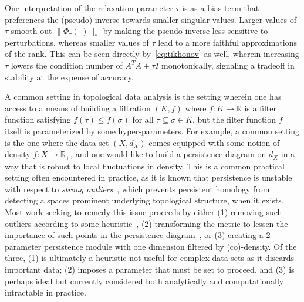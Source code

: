 \documentclass[10pt]{article}
\numberwithin{equation}{section}
\newcommand{\+}{%
	\raisebox{0.18ex}{\scaleobj{0.55}{+}}
}
\theoremstyle{definition}
\theoremstyle{definition}
\begin{document}
 One interpretation of the relaxation parameter $\tau$ is as a bias term that preferences the (pseudo)-inverse towards smaller singular values.
Larger values of $\tau$ smooth out $\lVert \Phi_\tau(\cdot) \rVert_\ast$ by making the pseudo-inverse less sensitive to perturbations, whereas smaller values of $\tau$ lead to a more faithful approximations of the rank.
This can be seen directly by~\eqref{eq:tikhonov} as well, wherein increasing $\tau$ lowers the condition number of $A^T A + \tau I$ monotonically, signaling a tradeoff in stability at the expense of accuracy. 

A common setting in topological data analysis is the setting wherein one has access to a means of building a filtration $(K,f)$ where $f : K \to \mathbb{R}$ is a filter function satisfying $f(\tau) \leq f(\sigma)$ for all $\tau \subseteq \sigma \in K$, but the filter function $f$ itself is parameterized by some hyper-parameters. 
For example, a common setting is the one where the data set $(X, d_X)$ comes equipped with some notion of density $f: X \to \mathbb{R}_+$, and one would like to build a persistence diagram on $d_X$ in a way that is robust to local fluctuations in density. 
This is a common practical setting often encountered in practice, as it is known that persistence is unstable with respect to \emph{strong outliers}~\cite{}, which prevents persistent homology from detecting a spaces prominent underlying topological structure, when it exists. 
Most work seeking to remedy this issue proceeds by either (1) removing such outliers according to some heuristic~\cite{}, (2) transforming the  metric to lessen the importance of such points in the persistence diagram~\cite{}, or (3) creating a 2-parameter persistence module with one dimension filtered by (co)-density. 
Of the three, (1) is ultimately a heuristic not useful for complex data sets as it discards important data; (2)  imposes a parameter that must be set to proceed, and (3) is perhaps ideal but currently considered both analytically and computationally intractable in practice. 
\end{document}
